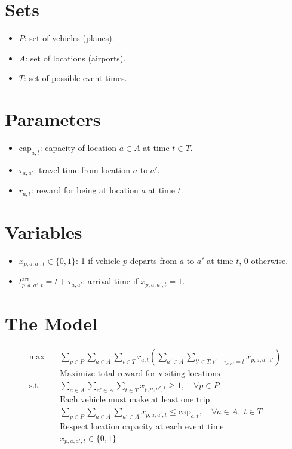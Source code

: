 \documentclass{article}
\begin{document}

\section{Sets}
\begin{itemize}[leftmargin=*,nosep]
    \item $P$: set of vehicles (planes).
    \item $A$: set of locations (airports).
    \item $T$: set of possible event times.
\end{itemize}

\section{Parameters}
\begin{itemize}[leftmargin=*,nosep]
    \item $\text{cap}_{a,t}$: capacity of location $a \in A$ at time $t \in T$.
    \item $\tau_{a,a'}$: travel time from location $a$ to $a'$.
    \item $r_{a,t}$: reward for being at location $a$ at time $t$.
\end{itemize}

\section{Variables}
\begin{itemize}[leftmargin=*,nosep]
    \item $x_{p,a,a',t} \in \{0,1\}$: 1 if vehicle $p$ departs from $a$ to $a'$ at time $t$, 0 otherwise.
    \item $t^{\text{arr}}_{p,a,a',t} = t + \tau_{a,a'}$: arrival time if $x_{p,a,a',t} = 1$.
\end{itemize}

\section{The Model}
\begin{align*}
    \max \quad & \sum_{p \in P} \sum_{a \in A} \sum_{t \in T} r_{a,t} \left( \sum_{a' \in A} \sum_{t' \in T: t' + \tau_{a,a'} = t} x_{p,a,a',t'} \right) \\
    & \text{Maximize total reward for visiting locations} \\
\text{s.t.} \quad 
    & \sum_{a \in A} \sum_{a' \in A} \sum_{t \in T} x_{p,a,a',t} \geq 1, \quad \forall p \in P \\
    & \text{Each vehicle must make at least one trip} \\
    & \sum_{p \in P} \sum_{a \in A} \sum_{a' \in A} x_{p,a,a',t} \leq \text{cap}_{a,t}, \quad \forall a \in A,\; t \in T \\
    & \text{Respect location capacity at each event time} \\
    & x_{p,a,a',t} \in \{0,1\}
\end{align*}
\end{document}

